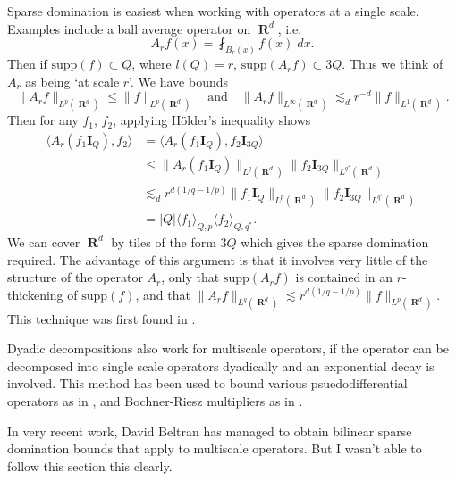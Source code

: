 \documentclass[openany,nobib,nols,a4paper,twoside,symmetric,justified,notoc]{tufte-book}
\theoremstyle{plain}
\theoremstyle{remark}
\theoremstyle{definition}
\DeclareMathOperator{\RR}{\mathbf{R}}
\begin{document}
\begin{itemize}
    Sparse domination is easiest when working with operators at a single scale. Examples include a ball average operator on $\RR^d$, i.e.
    \[ A_rf(x) = \fint_{B_r(x)} f(x)\; dx. \]
    Then if $\text{supp}(f) \subset Q$, where $l(Q) = r$, $\text{supp}(A_r f) \subset 3Q$. Thus we think of $A_r$ as being `at scale $r$'. We have bounds
    \[ \| A_r f \|_{L^p(\RR^d)} \leq \| f \|_{L^p(\RR^d)} \quad\text{and}\quad \| A_r f \|_{L^\infty(\RR^d)} \lesssim_d r^{-d} \| f \|_{L^1(\RR^d)}. \]
    Then for any $f_1$, $f_2$, applying H\"{o}lder's inequality shows
    \begin{align*}
        \langle A_r(f_1 \mathbf{I}_Q), f_2 \rangle &= \langle A_r(f_1 \mathbf{I}_Q), f_2 \mathbf{I}_{3Q} \rangle\\
        &\leq \| A_r(f_1 \mathbf{I}_Q) \|_{L^q(\RR^d)} \| f_2 \mathbf{I}_{3Q} \|_{L^{q^*}(\RR^d)}\\
        &\lesssim_d r^{d(1/q - 1/p)} \| f_1 \mathbf{I}_Q \|_{L^p(\RR^d)} \| f_2 \mathbf{I}_{3Q} \|_{L^{q^*}(\RR^d)}\\
        &= |Q| \langle f_1 \rangle_{Q,p} \langle f_2 \rangle_{Q,q^*}.
    \end{align*}
    We can cover $\RR^d$ by tiles of the form $3Q$ which gives the sparse domination required. The advantage of this argument is that it involves very little of the structure of the operator $A_r$, only that $\text{supp}(A_r f)$ is contained in an $r$-thickening of $\text{supp}(f)$, and that $\| A_r f \|_{L^q(\RR^d)} \lesssim r^{d(1/q - 1/p)} \| f \|_{L^p(\RR^d)}$. This technique was first found in \cite{Lacey2016}.

    Dyadic decompositions also work for multiscale operators, if the operator can be decomposed into single scale operators dyadically and an exponential decay is involved. This method has been used to bound various psuedodifferential operators as in \cite{Beltran2017}, and Bochner-Riesz multipliers as in \cite{Lacey2017}.

    In very recent work, David Beltran has managed to obtain bilinear sparse domination bounds that apply to multiscale operators. But I wasn't able to follow this section this clearly.


\end{itemize}
\end{document}
